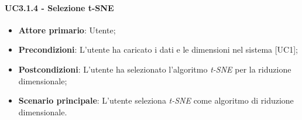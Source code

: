 \paragraph{UC3.1.4 - Selezione t-SNE}

\begin{itemize}
	\item \textbf{Attore primario}: Utente;
	\item \textbf{Precondizioni}: L'utente ha caricato i dati e le dimensioni nel sistema [UC1];
	\item \textbf{Postcondizioni}: L'utente ha selezionato l'algoritmo \textit{t-SNE} per la riduzione dimensionale;
	\item \textbf{Scenario principale}: L'utente seleziona \textit{t-SNE} come algoritmo di riduzione dimensionale.
\end{itemize}